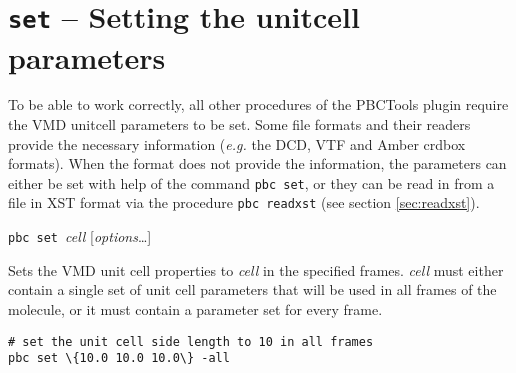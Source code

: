 \documentclass[a4paper, DIV12]{scrartcl}
\newcommand{\eg}{\emph{e.g.}\xspace}
\newcommand{\pbctools}{PBCTools\xspace}
\begin{document}
\newpage
\section{\texttt{set} -- Setting the unitcell parameters}
\label{sec:set}

To be able to work correctly, all other procedures of the \pbctools
plugin require the VMD unitcell parameters to be set.  Some file
formats and their readers provide the necessary information (\eg the
DCD, VTF and Amber crdbox formats).  When the format does not provide
the information, the parameters can either be set with help of the
command \texttt{pbc set}, or they can be read in from a file in XST
format via the procedure \texttt{pbc readxst} (see section
\ref{sec:readxst}).

\mbox{\texttt{pbc} \texttt{set} \textit{cell}} [\textit{options}\dots]


Sets the VMD unit cell properties to \textit{cell} in the specified
frames. \textit{cell} must either contain a single set of unit cell
parameters that will be used in all frames of the molecule, or it must
contain a parameter set for every frame.


\begin{Verbatim} 
# set the unit cell side length to 10 in all frames
pbc set \{10.0 10.0 10.0\} -all
\end{Verbatim}

\end{document}
